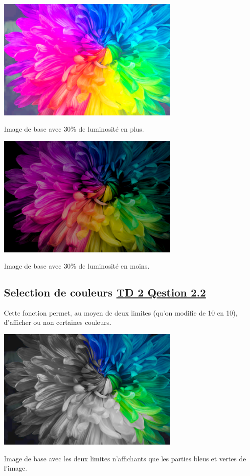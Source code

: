 \documentclass{article}
\begin{document}
\begin{center} 
    \includegraphics[width=9cm]{../LuminositePlus3}

    Image de base avec 30\% de luminosité en plus.
    \end{center}
\bigbreak

\begin{center} 
    \includegraphics[width=9cm]{../LuminositeMoins3}

    Image de base avec 30\% de luminosité en moins.
    \end{center}

\subsection{Selection de couleurs \underline{TD 2 Qestion 2.2}}
Cette fonction permet, au moyen de deux limites (qu'on modifie de 10 en 10), d'afficher ou non certaines couleurs.
\bigbreak

\begin{center} 
    \includegraphics[width=9cm]{../SelectedColor}

    Image de base avec les deux limites n'affichants que les parties bleus et vertes de l'image.
    \end{center}
\end{document}

